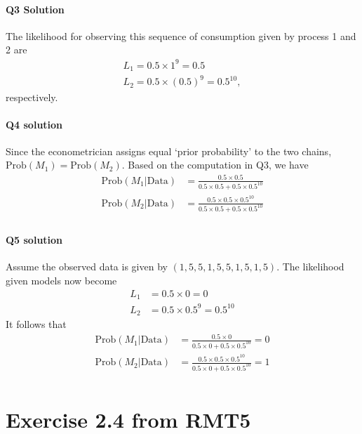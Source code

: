 \documentclass[11pt]{article}
\theoremstyle{definition}
\theoremstyle{boldtitle} %
\numberwithin{equation}{section}
\numberwithin{figure}{section}
\numberwithin{table}{section}
\begin{document}
\paragraph{Q3 Solution}
The likelihood for observing this sequence of consumption given by process 1 and 2 are 
\begin{align*}
    L_1 = 0.5 \times 1^9 = 0.5 \\
    L_2 = 0.5 \times (0.5)^9 = 0.5^{10},
\end{align*}
respectively.

\paragraph{Q4 solution}
Since the econometrician assigns equal `prior probability' to the two chains,
$\text{Prob}(M_1) = \text{Prob}(M_2)$. 
Based on the computation in Q3, we have 
\begin{align*}
    \text{Prob}(M_1|\text{Data}) & = \frac{0.5 \times 0.5}{0.5 \times 0.5 + 0.5 \times 0.5^{10}} \\
    \text{Prob}(M_2|\text{Data}) & = \frac{0.5 \times 0.5 \times 0.5^{10}}{0.5 \times 0.5 + 0.5 \times 0.5^{10}} \\
\end{align*}

\paragraph{Q5 solution}
Assume the observed data is given by $(1,5,5,1,5,5,1,5,1,5)$.
The likelihood given models now become 
\begin{align*}
    L_1 & = 0.5 \times 0 = 0 \\
    L_2 & = 0.5 \times 0.5^9 = 0.5^{10}
\end{align*}
It follows that 
\begin{align*}
    \text{Prob}(M_1|\text{Data}) & = \frac{0.5 \times 0}{0.5 \times 0 + 0.5 \times 0.5^{10}} = 0 \\
    \text{Prob}(M_2|\text{Data}) & = \frac{0.5 \times 0.5 \times 0.5^{10}}{0.5 \times 0 + 0.5 \times 0.5^{10}} = 1 \\
\end{align*}


\section*{Exercise 2.4 from RMT5}
\end{document}
